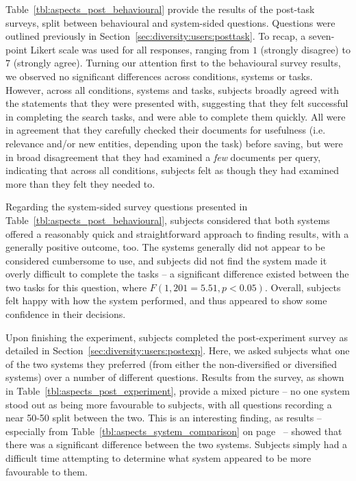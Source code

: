  Table~\ref{tbl:aspects_post_behavioural} provide the results of the post-task surveys, split between behavioural and system-sided questions. Questions were outlined previously in Section~\ref{sec:diversity:users:posttask}. To recap, a seven-point Likert scale was used for all responses, ranging from $1$ (strongly disagree) to $7$ (strongly agree). Turning our attention first to the behavioural survey results, we observed no significant differences across conditions, systems or tasks. However, across all conditions, systems and tasks, subjects broadly agreed with the statements that they were presented with, suggesting that they felt successful in completing the search tasks, and were able to complete them quickly. All were in agreement that they carefully checked their documents for usefulness (i.e. relevance and/or new entities, depending upon the task) before saving, but were in broad disagreement that they had examined a \emph{few} documents per query, indicating that across all conditions, subjects felt as though they had examined more than they felt they needed to.

Regarding the system-sided survey questions presented in Table~\ref{tbl:aspects_post_behavioural}, subjects considered that both systems offered a reasonably quick and straightforward approach to finding results, with a generally positive outcome, too. The systems generally did not appear to be considered cumbersome to use, and subjects did not find the system made it overly difficult to complete the tasks -- a significant difference existed between the two tasks for this question, where $F(1, 201=5.51, p<0.05)$. Overall, subjects felt happy with how the system performed, and thus appeared to show some confidence in their decisions.

Upon finishing the experiment, subjects completed the post-experiment survey as detailed in Section~\ref{sec:diversity:users:postexp}. Here, we asked subjects what one of the two systems they preferred (from either the non-diversified or diversified systems) over a number of different questions. Results from the survey, as shown in Table~\ref{tbl:aspects_post_experiment}, provide a mixed picture -- no one system stood out as being more favourable to subjects, with all questions recording a near 50-50 split between the two. This is an interesting finding, as results -- especially from Table~\ref{tbl:aspects_system_comparison} on page~\pageref{tbl:aspects_system_comparison} -- showed that there was a significant difference between the two systems. Subjects simply had a difficult time attempting to determine what system appeared to be more favourable to them.

